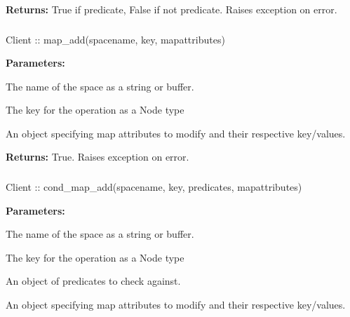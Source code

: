 \noindent\textbf{Returns:}
True if predicate, False if not predicate.  Raises exception on error.

\subsubsection{}
\label{api:nodejs:map_add}
\begin{javascriptcode}
Client :: map_add(spacename, key, mapattributes)
\end{javascriptcode}


\noindent\textbf{Parameters:}
\begin{description}[labelindent=\widthof{{\code{mapattributes}}},leftmargin=*,noitemsep,nolistsep,align=right]
\item[\code{spacename}] The name of the space as a string or buffer.
\item[\code{key}] The key for the operation as a Node type
\item[\code{mapattributes}] An object specifying map attributes to modify and their respective key/values.
\end{description}

\noindent\textbf{Returns:}
True.  Raises exception on error.

\subsubsection{}
\label{api:nodejs:cond_map_add}
\begin{javascriptcode}
Client :: cond_map_add(spacename, key, predicates, mapattributes)
\end{javascriptcode}


\noindent\textbf{Parameters:}
\begin{description}[labelindent=\widthof{{\code{mapattributes}}},leftmargin=*,noitemsep,nolistsep,align=right]
\item[\code{spacename}] The name of the space as a string or buffer.
\item[\code{key}] The key for the operation as a Node type
\item[\code{predicates}] An object of predicates to check against.
\item[\code{mapattributes}] An object specifying map attributes to modify and their respective key/values.
\end{description}

